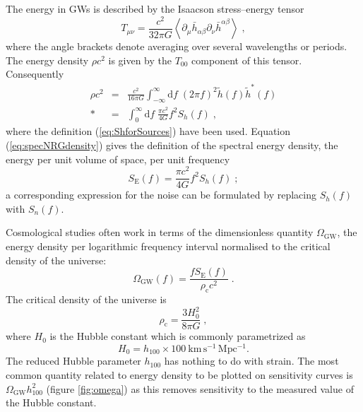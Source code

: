 The energy in GWs is described by the Isaacson stress--energy tensor \citep[section 35.15]{MTW}
\begin{equation}
T_{\mu\nu}=\frac{c^{2}}{32\pi G}\left<\partial_{\mu}\bar{h}_{\alpha\beta}\partial_{\nu}\bar{h}^{\alpha\beta}\right> \;,
\end{equation}
where the angle brackets denote averaging over several wavelengths or periods. The energy density $\rho c^{2}$ is given by the $T_{00}$ component of this tensor. Consequently
\begin{eqnarray}
\label{eq:specNRGdensity}
\rho c^{2} &=& \frac{c^{2}}{16\pi G}\int_{-\infty}^{\infty}\mathrm{d}f\;\left(2\pi f\right)^{2}\tilde{h}(f)\tilde{h}^{*}(f) \\*
 &=& \int_{0}^{\infty}\mathrm{d}f\;\frac{\pi c^{2}}{4G}f^{2}S_{h}(f)\; ,
\end{eqnarray} 
where the definition (\ref{eq:ShforSources}) have been used. Equation (\ref{eq:specNRGdensity}) gives the definition of the spectral energy density, the energy per unit volume of space, per unit frequency \citep{HellingsDowns}
\begin{equation}\label{eq:spectralenergydensity}
S_{\mathrm{E}}(f)=\frac{\pi c^{2}}{4G} f^{2}S_{h}(f) \; ;
\end{equation}
a corresponding expression for the noise can be formulated by replacing $S_h(f)$ with $S_{n}(f)$.

Cosmological studies often work in terms of the dimensionless quantity $\Omega_{\mathrm{GW}}$, the energy density per logarithmic frequency interval normalised to the critical density of the universe:
\begin{equation}
\label{eq:omega}
\Omega_\mathrm{GW}(f) = \frac{fS_{\mathrm{E}}(f)}{\rho_{\mathrm{c}}c^{2}} \; .
\end{equation}
The critical density of the universe is
\begin{equation}\label{eq:crit-density}
\rho_{\mathrm{c}}=\frac{3H_{0}^{2}}{8\pi G} \;,
\end{equation}
 where $H_{0}$ is the Hubble constant which is commonly parametrized as
\begin{equation}
H_0 =h_{100}\times 100~\mathrm{km\,s^{-1}\,Mpc^{-1}}.
\end{equation}
The reduced Hubble parameter $h_{100}$ has nothing to do with strain. The most common quantity related to energy density to be plotted on sensitivity curves is $\Omega_{\mathrm{GW}}h_{100}^{2}$ (figure \ref{fig:omega}) as this removes sensitivity to the measured value of the Hubble constant.

